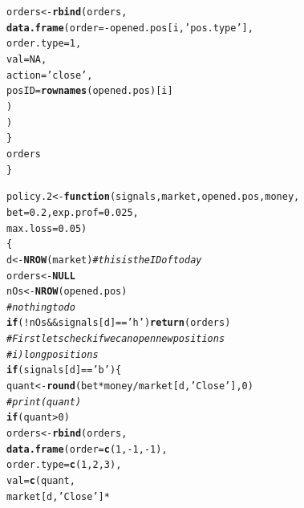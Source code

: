 \documentclass{article}\usepackage[]{graphicx}\usepackage[]{color}
\makeatletter
\newcommand{\hlnum}[1]{\textcolor[rgb]{0.686,0.059,0.569}{#1}}%
\newcommand{\hlstr}[1]{\textcolor[rgb]{0.192,0.494,0.8}{#1}}%
\newcommand{\hlcom}[1]{\textcolor[rgb]{0.678,0.584,0.686}{\textit{#1}}}%
\newcommand{\hlopt}[1]{\textcolor[rgb]{0,0,0}{#1}}%
\newcommand{\hlstd}[1]{\textcolor[rgb]{0.345,0.345,0.345}{#1}}%
\newcommand{\hlkwa}[1]{\textcolor[rgb]{0.161,0.373,0.58}{\textbf{#1}}}%
\newcommand{\hlkwb}[1]{\textcolor[rgb]{0.69,0.353,0.396}{#1}}%
\newcommand{\hlkwc}[1]{\textcolor[rgb]{0.333,0.667,0.333}{#1}}%
\newcommand{\hlkwd}[1]{\textcolor[rgb]{0.737,0.353,0.396}{\textbf{#1}}}%
\newenvironment{kframe}{%
 \def\at@end@of@kframe{}%
 \ifinner\ifhmode%
  \def\at@end@of@kframe{\end{minipage}}%
  \begin{minipage}{\columnwidth}%
 \fi\fi%
 \def\FrameCommand##1{\hskip\@totalleftmargin \hskip-\fboxsep
 \colorbox{shadecolor}{##1}\hskip-\fboxsep
     \hskip-\linewidth \hskip-\@totalleftmargin \hskip\columnwidth}%
 \MakeFramed {\advance\hsize-\width
   \@totalleftmargin\z@ \linewidth\hsize
   \@setminipage}}%
 {\par\unskip\endMakeFramed%
 \at@end@of@kframe}
\newenvironment{knitrout}{}{} %
\makeatother
\begin{document}
\begin{CJK*}{UTF8}{gkai}
\begin{knitrout}
\begin{kframe}
\begin{alltt}
        \hlstd{orders} \hlkwb{<-} \hlkwd{rbind}\hlstd{(orders,}
                        \hlkwd{data.frame}\hlstd{(}\hlkwc{order} \hlstd{=} \hlopt{-}\hlstd{opened.pos[i,} \hlstr{'pos.type'}\hlstd{],}
                                   \hlkwc{order.type} \hlstd{=} \hlnum{1}\hlstd{,}
                                   \hlkwc{val} \hlstd{=} \hlnum{NA}\hlstd{,}
                                   \hlkwc{action} \hlstd{=} \hlstr{'close'}\hlstd{,}
                                   \hlkwc{posID} \hlstd{=} \hlkwd{rownames}\hlstd{(opened.pos)[i]}
                                   \hlstd{)}
                        \hlstd{)}
        \hlstd{\}}
  \hlstd{orders}
\hlstd{\}}
\end{alltt}
\end{kframe}
\end{knitrout}
\begin{knitrout}
\color{fgcolor}\begin{kframe}
\begin{alltt}
\hlstd{policy.2} \hlkwb{<-} \hlkwa{function}\hlstd{(}\hlkwc{signals}\hlstd{,} \hlkwc{market}\hlstd{,} \hlkwc{opened.pos}\hlstd{,} \hlkwc{money}\hlstd{,}
                     \hlkwc{bet} \hlstd{=} \hlnum{0.2}\hlstd{,} \hlkwc{exp.prof} \hlstd{=} \hlnum{0.025}\hlstd{,}
                     \hlkwc{max.loss} \hlstd{=} \hlnum{0.05}\hlstd{)}
\hlstd{\{}
  \hlstd{d} \hlkwb{<-} \hlkwd{NROW}\hlstd{(market)} \hlcom{#this is the ID of today}
  \hlstd{orders} \hlkwb{<-} \hlkwa{NULL}
  \hlstd{nOs} \hlkwb{<-} \hlkwd{NROW}\hlstd{(opened.pos)}
  \hlcom{#nothing to do}
  \hlkwa{if}\hlstd{(}\hlopt{!}\hlstd{nOs} \hlopt{&&} \hlstd{signals[d]} \hlopt{==} \hlstr{'h'}\hlstd{)} \hlkwd{return} \hlstd{(orders)}
  \hlcom{#First lets check if we can open new positions}
  \hlcom{# i) long positions}
  \hlkwa{if} \hlstd{(signals[d]} \hlopt{==} \hlstr{'b'}\hlstd{)\{}
    \hlstd{quant} \hlkwb{<-} \hlkwd{round}\hlstd{(bet}\hlopt{*}\hlstd{money}\hlopt{/}\hlstd{market[d,} \hlstr{'Close'}\hlstd{],} \hlnum{0}\hlstd{)}
   \hlcom{# print(quant)}
    \hlkwa{if} \hlstd{(quant} \hlopt{>} \hlnum{0}\hlstd{)}
      \hlstd{orders} \hlkwb{<-} \hlkwd{rbind}\hlstd{(orders,}
                      \hlkwd{data.frame}\hlstd{(}\hlkwc{order} \hlstd{=} \hlkwd{c}\hlstd{(}\hlnum{1}\hlstd{,} \hlopt{-}\hlnum{1}\hlstd{,} \hlopt{-}\hlnum{1}\hlstd{),}
                                 \hlkwc{order.type} \hlstd{=} \hlkwd{c}\hlstd{(}\hlnum{1}\hlstd{,} \hlnum{2}\hlstd{,} \hlnum{3}\hlstd{),}
                                 \hlkwc{val} \hlstd{=} \hlkwd{c}\hlstd{(quant,}
                                         \hlstd{market[d,} \hlstr{'Close'}\hlstd{]}\hlopt{*}

\end{alltt}
\end{kframe}
\end{knitrout}
\end{CJK*}
\end{document}
